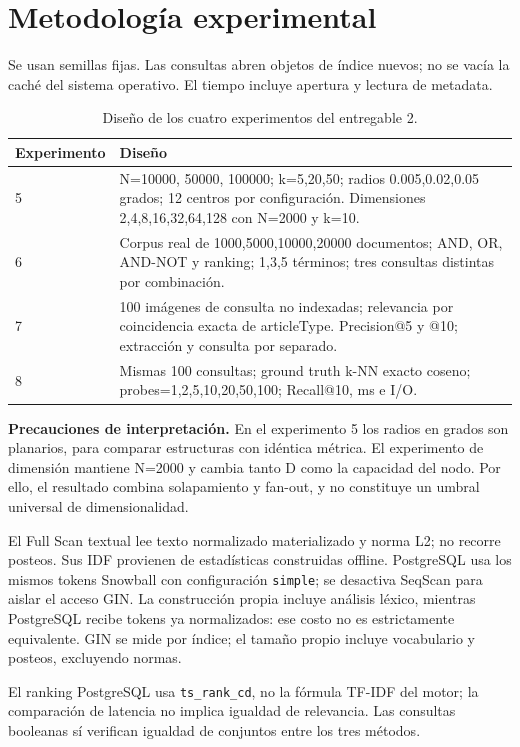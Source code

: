 \documentclass[11pt,a4paper]{article}
\newcommand{\code}[1]{\texttt{#1}}
\begin{document}
\newpage
\section{Metodología experimental}
Se usan semillas fijas. Las consultas abren objetos de índice nuevos; no se vacía la caché del sistema operativo. El tiempo incluye apertura y lectura de metadata.

\begin{table}[H]\centering\small
\begin{tabular}{@{}lp{10.5cm}@{}}\toprule
Experimento & Diseño\\\midrule
5 & N=10000, 50000, 100000; k=5,20,50; radios 0.005,0.02,0.05 grados; 12 centros por configuración. Dimensiones 2,4,8,16,32,64,128 con N=2000 y k=10.\\
6 & Corpus real de 1000,5000,10000,20000 documentos; AND, OR, AND-NOT y ranking; 1,3,5 términos; tres consultas distintas por combinación.\\
7 & 100 imágenes de consulta no indexadas; relevancia por coincidencia exacta de articleType. Precision@5 y @10; extracción y consulta por separado.\\
8 & Mismas 100 consultas; ground truth k-NN exacto coseno; probes=1,2,5,10,20,50,100; Recall@10, ms e I/O.\\\bottomrule
\end{tabular}\caption{Diseño de los cuatro experimentos del entregable 2.}
\end{table}

\textbf{Precauciones de interpretación.} En el experimento 5 los radios en grados son planarios, para comparar estructuras con idéntica métrica. El experimento de dimensión mantiene N=2000 y cambia tanto D como la capacidad del nodo. Por ello, el resultado combina solapamiento y fan-out, y no constituye un umbral universal de dimensionalidad.

El Full Scan textual lee texto normalizado materializado y norma L2; no recorre posteos. Sus IDF provienen de estadísticas construidas offline. PostgreSQL usa los mismos tokens Snowball con configuración \code{simple}; se desactiva SeqScan para aislar el acceso GIN. La construcción propia incluye análisis léxico, mientras PostgreSQL recibe tokens ya normalizados: ese costo no es estrictamente equivalente. GIN se mide por índice; el tamaño propio incluye vocabulario y posteos, excluyendo normas.

El ranking PostgreSQL usa \code{ts\_rank\_cd}, no la fórmula TF-IDF del motor; la comparación de latencia no implica igualdad de relevancia. Las consultas booleanas sí verifican igualdad de conjuntos entre los tres métodos. 
\end{document}

